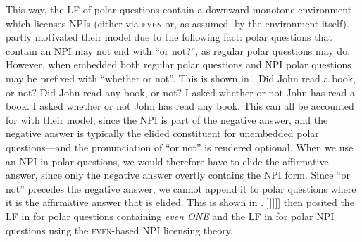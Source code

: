 \noindent This way, the LF of polar questions contain a downward monotone environment which licenses NPIs (either via {\scshape even} or, as \textcite{Guerzoni2014-enviro} assumed, by the environment itself). \textcite{Guerzoni2014-enviro} partly motivated their model due to the following fact: polar questions that contain an NPI may not end with \enquote{or not?}, as regular polar questions may do. However, when embedded both regular polar questions and NPI polar questions may be prefixed with \enquote{whether or not}. This is shown in .
\pex[nopreamble=true]\label{ex:q-elision-restriction}%
\a{} Did John read a book, or not?
\a{} \ljudge{\#}Did John read any book, or not?
\a{} I asked whether or not John has read a book.
\a{} I asked whether or not John has read any book.
\xe
This can all be accounted for with their model, since the NPI is part of the negative answer, and the negative answer is typically the elided constituent for unembedded polar questions---and the pronunciation of \enquote{or not} is rendered optional. When we use an NPI in polar questions, we would therefore have to elide the affirmative answer, since only the negative answer overtly contains the NPI form. Since \enquote{or not} precedes the negative answer, we cannot append it to polar questions where it is the affirmative answer that is elided. This is shown in .
\ex\phantomsection
[] [whether\textsuperscript{L} [ 1 [ Q [ \sout{[John read a book]} (or\textsubscript{1} [ not) [John read any book] ]\hspace{0.5mm}]\hspace{0.5mm}]\hspace{0.5mm}]\hspace{0.5mm}]
\xe
\textcite{Crnic2014-dogma,Crnic2014-nm} then posited the LF in  for polar questions containing \textit{even \MakeUppercase{one}} and the LF in  for polar NPI questions using the {\scshape even}-based NPI licensing theory.
\ex{} 
